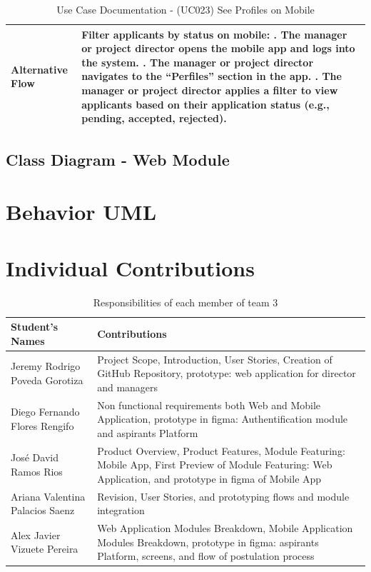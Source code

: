 \documentclass{scrreprt}
\begin{document}
\begin{table}[H]
\begin{tabular}{|p{3cm}|p{10cm}|}
		Alternative Flow & 
		\textbf{Filter applicants by status on mobile:} \newline
		1. The manager or project director opens the mobile app and logs into the system. \newline
		2. The manager or project director navigates to the “Perfiles” section in the app. \newline
		3. The manager or project director applies a filter to view applicants based on their application status (e.g., pending, accepted, rejected). \\ \hline
	\end{tabular}
	\caption{Use Case Documentation - (UC023) See Profiles on Mobile}
	\label{table:UC023}
\end{table}

\section{Class Diagram - Web Module}

\chapter{Behavior UML}



    
\chapter{Individual Contributions}
\vspace{2cm}

\begin{table}[h!]
    \centering \small
    \renewcommand{\arraystretch}{1.5} %
    \begin{tabular}{|p{5cm}|p{10cm}|} %
    \hline
    \textbf{Student's Names} & \textbf{Contributions} \\ \hline
    Jeremy Rodrigo Poveda Gorotiza & Project Scope, Introduction, User Stories, Creation of GitHub Repository, prototype: web application for director and managers \\ \hline
    Diego Fernando Flores Rengifo & Non functional requirements both Web and Mobile Application, prototype in figma: Authentification module and aspirants Platform  \\ \hline
    José David Ramos Rios & Product Overview, Product Features, Module Featuring: Mobile App, First Preview of Module Featuring: Web Application, and prototype in figma of Mobile App \\ \hline
    Ariana Valentina Palacios Saenz & Revision, User Stories, and prototyping flows and module integration\\ \hline
    Alex Javier Vizuete Pereira & Web Application Modules Breakdown, Mobile Application Modules Breakdown, prototype in figma: aspirants Platform, screens, and flow of postulation process\\ \hline
    \end{tabular}
    \caption{Responsibilities of each member of team 3}
\end{table} \FloatBarrier 
\end{document}

